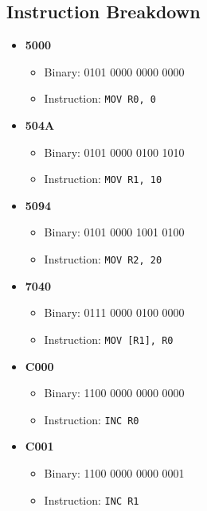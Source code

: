 \documentclass{report}
\begin{document}
\subsection{Instruction Breakdown}
\begin{itemize}
	\item \textbf{5000}
	      \begin{itemize}
		      \item Binary: 0101 0000 0000 0000
		      \item Instruction: \texttt{MOV R0, 0}
	      \end{itemize}

	\item \textbf{504A}
	      \begin{itemize}
		      \item Binary: 0101 0000 0100 1010
		      \item Instruction: \texttt{MOV R1, 10}
	      \end{itemize}

	\item \textbf{5094}
	      \begin{itemize}
		      \item Binary: 0101 0000 1001 0100
		      \item Instruction: \texttt{MOV R2, 20}
	      \end{itemize}

	\item \textbf{7040}
	      \begin{itemize}
		      \item Binary: 0111 0000 0100 0000
		      \item Instruction: \texttt{MOV [R1], R0}
	      \end{itemize}

	\item \textbf{C000}
	      \begin{itemize}
		      \item Binary: 1100 0000 0000 0000
		      \item Instruction: \texttt{INC R0}
	      \end{itemize}

	\item \textbf{C001}
	      \begin{itemize}
		      \item Binary: 1100 0000 0000 0001
		      \item Instruction: \texttt{INC R1}
	      \end{itemize}


\end{itemize}
\end{document}
